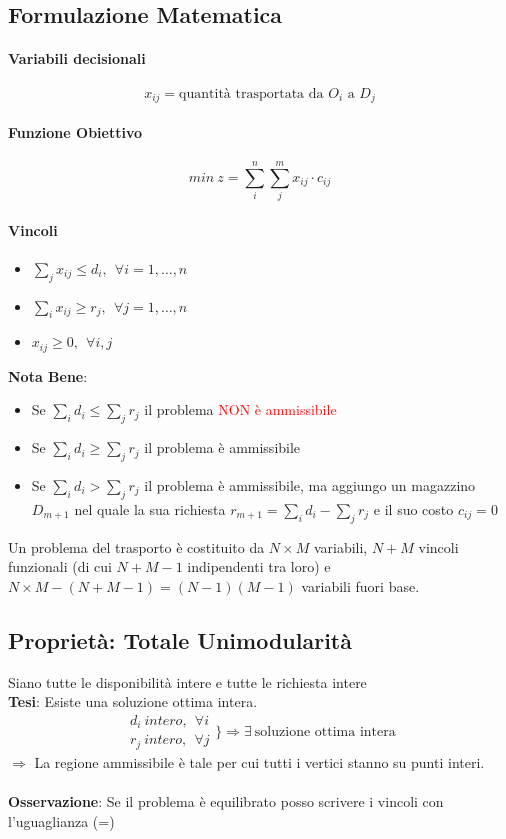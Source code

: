 \documentclass[12pt,a4paper]{article}
\begin{document}
\subsection{Formulazione Matematica}
\paragraph{Variabili decisionali} $$x_{ij} = \text{quantità trasportata da $O_i$ a $D_j$}$$
\paragraph{Funzione Obiettivo} $$min\ z = \sum_i^n \sum_j^m x_{ij}\cdot c_{ij}$$
\paragraph{Vincoli} \begin{itemize}
\item $\sum_j x_{ij} \leq d_i, \ \ \forall i = 1, \dots, n$
\item $\sum_i x_{ij} \geq r_j, \ \ \forall j = 1, \dots, n$
\item $x_{ij} \geq 0, \ \ \forall i, j$
\end{itemize}

\textbf{Nota Bene}: \begin{itemize}
\item Se $\sum_i d_i \leq \sum_j r_j$ il problema \textcolor{red}{NON è ammissibile}
\item Se $\sum_i d_i \geq \sum_j r_j$ il problema \textcolor{ao}{è ammissibile}
\item Se $\sum_i d_i > \sum_j r_j$ il problema \textcolor{ao}{è ammissibile}, ma aggiungo un magazzino $D_{m+1}$ nel quale la sua richiesta $r_{m+1} = \sum_i d_i - \sum_j r_j$ e il suo costo $c_{ij} = 0$
\end{itemize}

\noindent
Un problema del trasporto è costituito da $N \times M$ variabili, $N+M$ vincoli funzionali (di cui $N+M - 1$ indipendenti tra loro) e $N \times M - (N+M-1) = (N-1)(M-1)$ variabili fuori base.

\subsection{Proprietà: Totale Unimodularità}
Siano tutte le disponibilità intere e tutte le richiesta intere\\
\textbf{Tesi}: Esiste una soluzione ottima intera.
\begin{equation*}
\begin{array}{c}
d_i \ intero, \ \ \forall i\\
r_j \ intero, \ \ \forall j
\end{array} \Bigg\} \Rightarrow \exists \ \text{soluzione ottima intera}
\end{equation*}
$\Rightarrow$ La regione ammissibile è tale per cui tutti i vertici stanno su punti interi.\\
\\
\textbf{Osservazione}: Se il problema è equilibrato posso scrivere i vincoli con l'uguaglianza (=)
\end{document}
